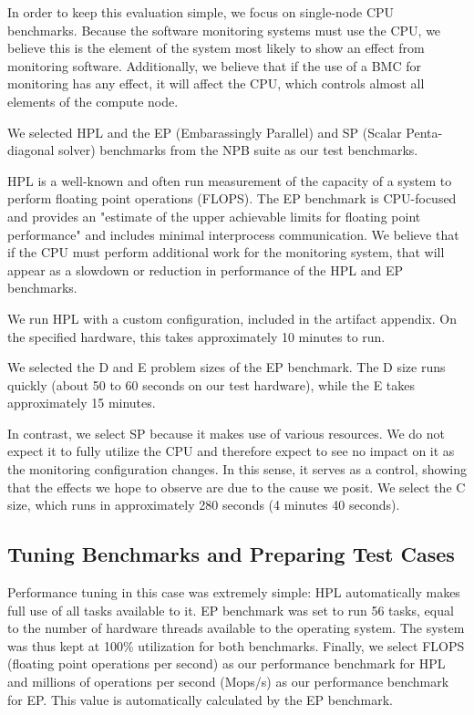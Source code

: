 \documentclass[conference]{IEEEtran}
\begin{document}
In order to keep this evaluation simple, we focus on single-node CPU 
benchmarks. Because the software monitoring systems must use the CPU, we 
believe this is the element of the system most likely to show an effect from 
monitoring software. Additionally, we believe that if the use of a BMC for 
monitoring has any effect, it will affect the CPU, which controls almost all 
elements of the compute node.

We selected HPL\cite{dongarraLINPACKBenchmarkPresent2003} and the EP (Embarassingly Parallel) and SP (Scalar Penta-diagonal solver) benchmarks from the NPB 
suite\cite{NASParallelBenchmarksa} as our test benchmarks. 

HPL is a well-known and often run measurement of the capacity of a system to 
perform floating point operations (FLOPS). The EP benchmark is 
CPU-focused and provides an "estimate of the
upper achievable limits for floating point performance"\cite{NASParallelBenchmarks}
and includes minimal interprocess communication. We believe that if the CPU 
must perform additional work for the monitoring system, that will appear as a 
slowdown or reduction in performance of the HPL and EP benchmarks.

We run HPL with a custom configuration, included in the artifact appendix. On 
the specified hardware, this takes approximately 10 minutes to run.

We selected the D and E problem sizes of the EP benchmark. The D size runs 
quickly (about 50 to 60 seconds on our test hardware), while the E takes 
approximately 15 minutes.

In contrast, we select SP because it makes use of various resources. We do not 
expect it to fully utilize the CPU and therefore expect to see no impact on it 
as the monitoring configuration changes. In this sense, it serves as a control, 
showing that the effects we hope to observe are due to the cause we posit. We 
select the C size, which runs in approximately 280 seconds (4 minutes 40 seconds).

\subsection{Tuning Benchmarks and Preparing Test Cases}

Performance tuning in this case was extremely simple: HPL automatically makes 
full use of all tasks available to it. EP benchmark was set 
to run 56 tasks, equal to the number of hardware threads available to the operating 
system. The system was thus kept at 100\% utilization for both benchmarks. 
Finally, we select FLOPS (floating point operations per second) as our performance benchmark for HPL and 
millions of operations per second (Mops/s) as our performance benchmark for EP. This 
value is automatically calculated by the EP benchmark.
\end{document}
